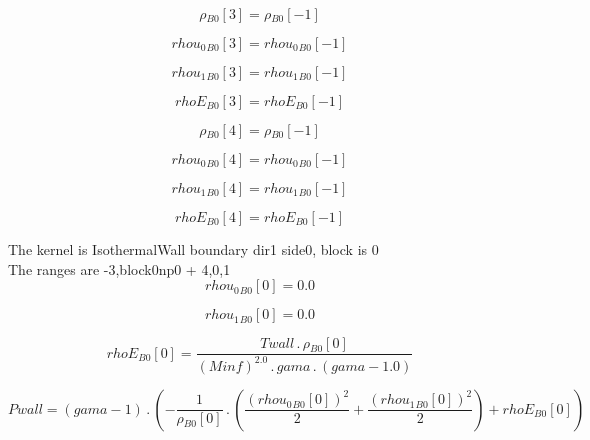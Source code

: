 \documentclass{article}
\begin{document}
\begin{dmath}{\rho{_{B0}}}[{3}] = {\rho{_{B0}}}[{-1}]\end{dmath}

\begin{dmath}{rhou_{0}{_{B0}}}[{3}] = {rhou_{0}{_{B0}}}[{-1}]\end{dmath}

\begin{dmath}{rhou_{1}{_{B0}}}[{3}] = {rhou_{1}{_{B0}}}[{-1}]\end{dmath}

\begin{dmath}{rhoE{_{B0}}}[{3}] = {rhoE{_{B0}}}[{-1}]\end{dmath}

\begin{dmath}{\rho{_{B0}}}[{4}] = {\rho{_{B0}}}[{-1}]\end{dmath}

\begin{dmath}{rhou_{0}{_{B0}}}[{4}] = {rhou_{0}{_{B0}}}[{-1}]\end{dmath}

\begin{dmath}{rhou_{1}{_{B0}}}[{4}] = {rhou_{1}{_{B0}}}[{-1}]\end{dmath}

\begin{dmath}{rhoE{_{B0}}}[{4}] = {rhoE{_{B0}}}[{-1}]\end{dmath}

\noindent The kernel is IsothermalWall boundary dir1 side0, block is 0\\\noindent The ranges are -3,block0np0 + 4,0,1\\\begin{dmath}{rhou_{0}{_{B0}}}[{0}] = 0.0\end{dmath}

\begin{dmath}{rhou_{1}{_{B0}}}[{0}] = 0.0\end{dmath}

\begin{dmath}{rhoE{_{B0}}}[{0}] = \frac{Twall \,.\, {\rho{_{B0}}}[{0}]}{\left(Minf \right)^{2.0} \,.\, gama \,.\, \left(gama - 1.0\right)}\end{dmath}

\begin{dmath}Pwall = \left(gama - 1\right) \,.\, \left(- \frac{1}{{\rho{_{B0}}}[{0}]} \,.\, \left(\frac{\left({rhou_{0}{_{B0}}}[{0}] \right)^{2}}{2} + \frac{\left({rhou_{1}{_{B0}}}[{0}] \right)^{2}}{2}\right) + {rhoE{_{B0}}}[{0}]\right)\end{dmath}
\end{document}
